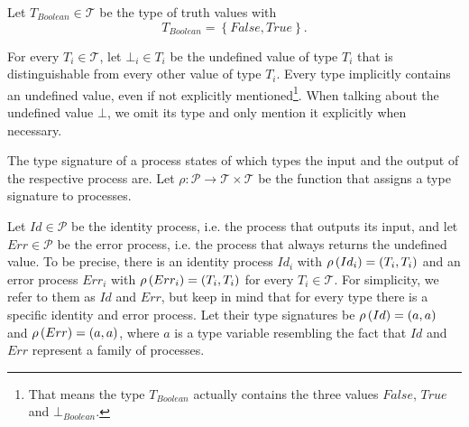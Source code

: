 \begin{definition}
Let $T_{Boolean} \in \mathcal{T}$ be the type of truth values with
\begin{equation*}
  T_{Boolean} = \left\{False, True \right\}.
\end{equation*}

\hfill\qedsymbol
\end{definition}

\begin{definition}
For every $T_i \in \mathcal{T}$, let $\bot_i \in T_i$ be the undefined value of type $T_i$ that is distinguishable from every other value of type $T_i$. Every type implicitly contains an undefined value, even if not explicitly mentioned\footnote{That means the type $T_{Boolean}$ actually contains the three values $False$, $True$ and $\bot_{Boolean}$.}. When talking about the undefined value $\bot$, we omit its type and only mention it explicitly when necessary.

\hfill\qedsymbol
\end{definition}


\begin{definition}
\label{def:type_signature}
The type signature of a process states of which types the input and the output of the respective process are. Let $\rho \colon \mathcal{P} \to \mathcal{T} \times \mathcal{T}$ be the function that assigns a type signature to processes.

\hfill\qedsymbol
\end{definition}


\begin{definition}
\label{def:static_id_err}
Let $Id \in \mathcal{P}$ be the identity process, i.e. the process that outputs its input, and let $Err \in \mathcal{P}$ be the error process, i.e. the process that always returns the undefined value. To be precise, there is an identity process $Id_i$ with $\rho \left( Id_i \right) = \left( T_i, T_i \right)$ and an error process $Err_i$ with $\rho \left( Err_i \right) = \left( T_i, T_i \right)$ for every $T_i \in \mathcal{T}$. For simplicity, we refer to them as $Id$ and $Err$, but keep in mind that for every type there is a specific identity and error process. Let their type signatures be $\rho \left( Id \right) = \left( a, a \right)$ and $\rho \left( Err \right) = \left( a, a \right)$, where $a$ is a type variable resembling the fact that $Id$ and $Err$ represent a family of processes.

\hfill\qedsymbol
\end{definition}

